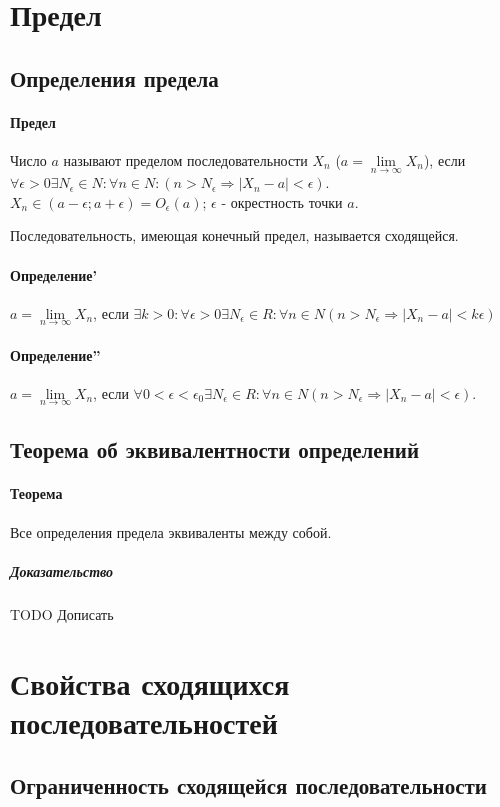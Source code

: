 \documentclass[10pt]{article}
\newcommand{\limninf}{\lim\limits_{n \to \infty}}
\begin{document}
	\section{Предел}
		\subsection{Определения предела}
			\paragraph{Предел} Число $a$ называют пределом последовательности $X_n$ ($a = \limninf X_n$), если\\
			$\forall \epsilon > 0 \exists N_\epsilon \in N : \forall n \in N : (n > N_\epsilon \Rightarrow |X_n - a| < \epsilon)$.\\
			$X_n \in (a - \epsilon; a + \epsilon) = O_\epsilon(a)$; $\epsilon$ - окрестность точки $a$.
			
			Последовательность, имеющая конечный предел, называется сходящейся.
			\paragraph{Определение'} $a = \limninf X_n$, если $\exists k > 0 : \forall \epsilon > 0 \exists N_\epsilon \in R : \forall n \in N (n > N_\epsilon \Rightarrow |X_n - a| < k\epsilon)$
			\paragraph{Определение''} $a = \limninf X_n$, если $\forall 0 < \epsilon < \epsilon_0 \exists N_\epsilon \in R : \forall n \in N (n > N_\epsilon \Rightarrow |X_n - a| < \epsilon)$.
		\subsection{Теорема об эквивалентности определений}
			\paragraph{Теорема}
		 	Все определения предела эквиваленты между собой.
			\subparagraph{Доказательство} 
			TODO Дописать
			
	\section{Свойства сходящихся последовательностей}
		\subsection{Ограниченность сходящейся последовательности}
\end{document}
